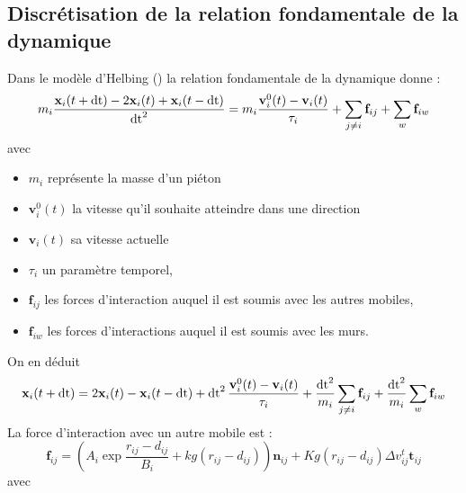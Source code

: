 \subsection{Discrétisation de la relation fondamentale de la dynamique}
%
\label{samuel2}
Dans le modèle d'Helbing (\cite{lemercier}) la relation fondamentale de la dynamique donne :
%
\[
m_i\frac{\mathbf{x}_i(t+\operatorname{dt}) - 2\mathbf{x}_i(t) + \mathbf{x}_i(t-\operatorname{dt})}{\operatorname{dt}^2} = m_i \frac{\mathbf{v}^0_i(t) - \mathbf{v}_i(t)}{\tau _i} + \sum_{j\neq i}\mathbf{f}_{ij} + \sum_{w}\mathbf{f}_{iw}
\]
avec
\begin{itemize}[leftmargin=1cm, label=, itemsep=0pt]%
\item  $m_i$ représente la masse d'un piéton
\item  $\mathbf{v}^0_i(t)$ la vitesse qu'il souhaite atteindre dans une direction
\item  $\mathbf{v}_i(t)$ sa vitesse actuelle
\item  $\tau_i$ un paramètre temporel,
\item  $\mathbf{f}_{ij}$ les forces d'interaction auquel il est soumis avec les autres mobiles,
\item  $\mathbf{f}_{iw}$ les forces d'interactions auquel il est soumis avec les murs.
\end{itemize}
On en déduit
\[
\mathbf{x}_i(t+\operatorname{dt}) = 2\mathbf{x}_i(t) - \mathbf{x}_i(t-\operatorname{dt}) + \operatorname{dt}^2  \frac{\mathbf{v}^0_i(t) - \mathbf{v}_i(t)}{\tau _i} + \frac{\operatorname{dt}^2}{m_i} \sum_{j\neq i}\mathbf{f}_{ij} + \frac{\operatorname{dt}^2}{m_i} \sum_{w}\mathbf{f}_{iw}
\]
La force d'interaction avec un autre mobile est :
%
\[
\mathbf{f}_{ij} = \left( A_i \exp{\frac{r_{ij}-d_{ij}}{B_i}} + kg(r_{ij}-d_{ij})\right) \mathbf{n}_{ij} + Kg(r_{ij}-d_{ij})\Delta v^t_{ij}\mathbf{t}_{ij}
\]
%
avec
